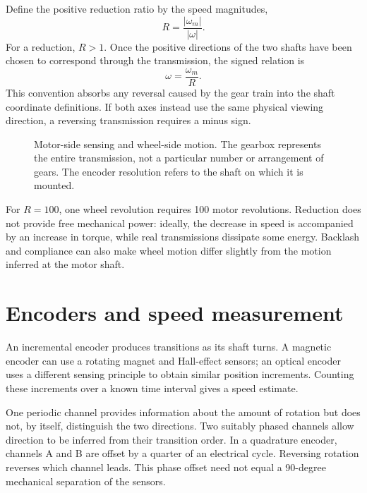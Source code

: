 Define the positive reduction ratio by the speed magnitudes,
\begin{equation}
 R=\frac{|\omega_m|}{|\omega|}.
 \label{eq:l08-ratio}
\end{equation}
For a reduction, $R>1$. Once the positive directions of the two shafts have
been chosen to correspond through the transmission, the signed relation is
\begin{equation}
 \omega=\frac{\omega_m}{R}.
 \label{eq:l08-wheelomega}
\end{equation}
This convention absorbs any reversal caused by the gear train into the shaft
coordinate definitions. If both axes instead use the same physical viewing
direction, a reversing transmission requires a minus sign.

\begin{figure}[htbp]
\centering
\caption{Motor-side sensing and wheel-side motion. The gearbox represents
the entire transmission, not a particular number or arrangement of gears.
The encoder resolution refers to the shaft on which it is mounted.}
\label{fig:l08-transmission}
\end{figure}

For $R=100$, one wheel revolution requires 100 motor revolutions. Reduction
does not provide free mechanical power: ideally, the decrease in speed is
accompanied by an increase in torque, while real transmissions dissipate
some energy. Backlash and compliance can also make wheel motion differ
slightly from the motion inferred at the motor shaft.

\section{Encoders and speed measurement}
An incremental encoder produces transitions as its shaft turns. A magnetic
encoder can use a rotating magnet and Hall-effect sensors; an optical encoder
uses a different sensing principle to obtain similar position increments.
Counting these increments over a known time interval gives a speed estimate.

One periodic channel provides information about the amount of rotation but
does not, by itself, distinguish the two directions. Two suitably phased
channels allow direction to be inferred from their transition order.
In a quadrature encoder, channels A and B are offset by a quarter of an
electrical cycle. Reversing rotation reverses which channel leads. This phase
offset need not equal a 90-degree mechanical separation of the sensors.

